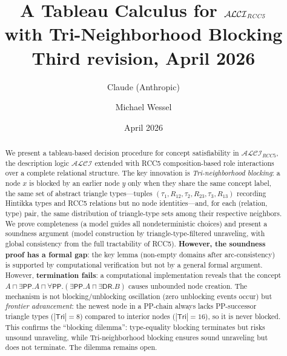\documentclass[a4paper,11pt]{article}
\title{A Tableau Calculus for $\ALCIRCC{5}$\\
  with Tri-Neighborhood Blocking\\[4pt]
  \large Third revision, April 2026}
\author{Claude (Anthropic) \and Michael Wessel}
\date{April 2026}
\theoremstyle{definition}
\newcommand{\ALCI}{\ensuremath{\mathcal{ALCI}}}
\newcommand{\ALCIRCC}[1]{\ensuremath{\mathcal{ALCI}_{\mathit{RCC#1}}}}
\newcommand{\DR}{\ensuremath{\mathsf{DR}}}
\newcommand{\PP}{\ensuremath{\mathsf{PP}}}
\newcommand{\Tri}{\ensuremath{\mathsf{Tri}}}
\begin{document}
\maketitle

\begin{center}
\end{center}

\bigskip

\begin{abstract}
We present a tableau-based decision procedure for concept
satisfiability in $\ALCIRCC{5}$, the description logic $\ALCI$
extended with RCC5 composition-based role interactions over a
complete relational structure. The key innovation is
\emph{Tri-neighborhood blocking}: a node $x$ is blocked by an
earlier node $y$ only when they share the same concept label,
the same set of abstract triangle types---tuples
$(\tau_1, R_{12}, \tau_2, R_{23}, \tau_3, R_{13})$ recording
Hintikka types and RCC5 relations but no node identities---and,
for each (relation, type) pair, the same distribution of
triangle-type sets among their respective neighbors.
We prove completeness
(a model guides all nondeterministic choices) and present
a soundness argument (model construction
by triangle-type-filtered unraveling, with global consistency
from the full tractability of RCC5).
\textbf{However, the soundness proof has a formal gap}:
the key lemma (non-empty domains after arc-consistency) is
supported by computational verification but not by a general
formal argument.
However, \textbf{termination fails}: a computational
implementation reveals that the concept
$A \sqcap \exists\PP.A \sqcap \forall\PP.(\exists\PP.A
\sqcap \exists\DR.B)$ causes unbounded node creation.
The mechanism is not blocking/unblocking oscillation (zero
unblocking events occur) but \emph{frontier advancement}:
the newest node in a PP-chain always lacks PP-successor
triangle types ($|\Tri| = 8$) compared to interior
nodes ($|\Tri| = 16$), so it is never blocked.
This confirms the ``blocking dilemma'': type-equality
blocking terminates but risks unsound unraveling, while
Tri-neighborhood blocking ensures sound unraveling but
does not terminate.  The dilemma remains open.
\end{abstract}
\end{document}
